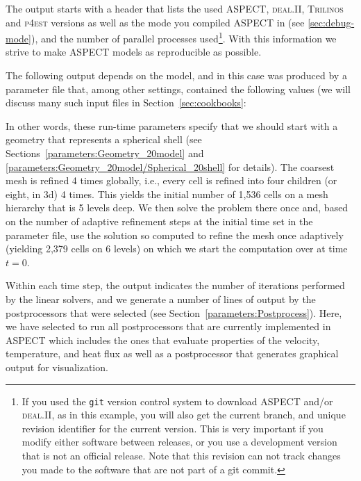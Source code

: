 \documentclass{article}
\newcommand{\dealii}{{\textsc{deal.II}}}
\newcommand{\pfrst}{{\normalfont\textsc{p4est}}}
\newcommand{\trilinos}{{\textsc{Trilinos}}}
\newcommand{\aspect}{\textsc{ASPECT}}
\begin{document}
The output starts with a header that lists the used \aspect{}, \dealii{},
\trilinos{} and \pfrst{} versions as well as the mode you compiled \aspect{} in
(see \ref{sec:debug-mode}), and the number of parallel processes
used\footnote{If you used the \texttt{git} version control system to download
\aspect{} and/or \dealii{}, as in this example, you will also get the current
branch, and unique revision identifier for the current version. This is very
important if you modify either software between releases, or you use a
development version that is not an official release. Note that this revision
can not track changes you made to the software that are not part of a git
commit.}.  With this information we strive to make
\aspect{} models as reproducible as possible.

The following output depends on the model, and in this case was produced by
a parameter file that, among other settings, contained the following values
(we will discuss many such input files in Section~\ref{sec:cookbooks}:


In other words, these run-time parameters specify that we should start with a
geometry that represents a spherical shell (see
Sections~\ref{parameters:Geometry_20model} and
\ref{parameters:Geometry_20model/Spherical_20shell} for details). The coarsest
mesh is refined 4 times globally, i.e., every cell is refined into four
children (or eight, in 3d) 4 times. This yields the initial number of 1,536
cells on a mesh hierarchy that is 5 levels deep. We then solve the problem
there once and, based on the number of adaptive refinement steps at the
initial time set in the parameter file, use the solution so computed to refine
the mesh once adaptively (yielding 2,379 cells on 6 levels) on which we start
the computation over at time $t=0$.

Within each time step, the output indicates the number of iterations performed
by the linear solvers, and we generate a number of lines of output by the
postprocessors that were selected (see
Section~\ref{parameters:Postprocess}). Here, we have selected to run all
postprocessors that are currently implemented in \aspect{} which includes the
ones that evaluate properties of the velocity, temperature, and heat flux as
well as a postprocessor that generates graphical output for visualization.
\end{document}
